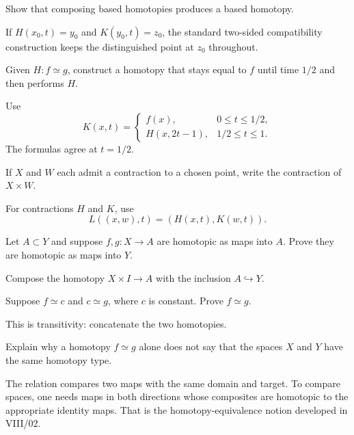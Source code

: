 \begin{problem}\label{prob:viii01-07}
Show that composing based homotopies produces a based homotopy.
\end{problem}
\begin{solution}
If \(H(x_0,t)=y_0\) and \(K(y_0,t)=z_0\), the standard two-sided compatibility
construction keeps the distinguished point at \(z_0\) throughout.
\end{solution}

\begin{problem}\label{prob:viii01-08}
Given \(H:f\simeq g\), construct a homotopy that stays equal to \(f\) until
time \(1/2\) and then performs \(H\).
\end{problem}
\begin{solution}
Use
\[
K(x,t)=
\begin{cases}
f(x),&0\le t\le1/2,\\
H(x,2t-1),&1/2\le t\le1.
\end{cases}
\]
The formulas agree at \(t=1/2\).
\end{solution}

\begin{problem}\label{prob:viii01-09}
If \(X\) and \(W\) each admit a contraction to a chosen point, write the
contraction of \(X\times W\).
\end{problem}
\begin{solution}
For contractions \(H\) and \(K\), use
\[
L((x,w),t)=(H(x,t),K(w,t)).
\]
\end{solution}

\begin{problem}\label{prob:viii01-10}
Let \(A\subset Y\) and suppose \(f,g:X\to A\) are homotopic as maps into \(A\).
Prove they are homotopic as maps into \(Y\).
\end{problem}
\begin{solution}
Compose the homotopy \(X\times I\to A\) with the inclusion \(A\hookrightarrow Y\).
\end{solution}

\begin{problem}\label{prob:viii01-11}
Suppose \(f\simeq c\) and \(c\simeq g\), where \(c\) is constant.  Prove
\(f\simeq g\).
\end{problem}
\begin{solution}
This is transitivity: concatenate the two homotopies.
\end{solution}

\begin{problem}\label{prob:viii01-12}
Explain why a homotopy \(f\simeq g\) alone does not say that the spaces \(X\)
and \(Y\) have the same homotopy type.
\end{problem}
\begin{solution}
The relation compares two maps with the same domain and target.  To compare
spaces, one needs maps in both directions whose composites are homotopic to the
appropriate identity maps.  That is the homotopy-equivalence notion developed
in VIII/02.
\end{solution}
